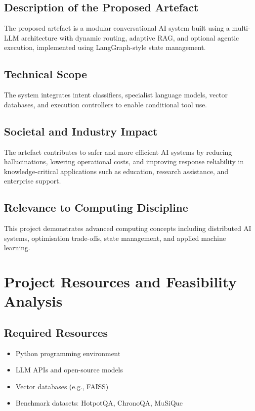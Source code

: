 \documentclass[12pt,a4paper]{article}
\begin{document}
\subsection{Description of the Proposed Artefact}

The proposed artefact is a modular conversational AI system built using a multi-LLM architecture with dynamic routing, adaptive RAG, and optional agentic execution, implemented using LangGraph-style state management.

\subsection{Technical Scope}

The system integrates intent classifiers, specialist language models, vector databases, and execution controllers to enable conditional tool use.

\subsection{Societal and Industry Impact}

The artefact contributes to safer and more efficient AI systems by reducing hallucinations, lowering operational costs, and improving response reliability in knowledge-critical applications such as education, research assistance, and enterprise support.

\subsection{Relevance to Computing Discipline}

This project demonstrates advanced computing concepts including distributed AI systems, optimisation trade-offs, state management, and applied machine learning.


\section{Project Resources and Feasibility Analysis}

\subsection{Required Resources}

\begin{itemize}
    \item Python programming environment
    \item LLM APIs and open-source models
    \item Vector databases (e.g., FAISS)
    \item Benchmark datasets: HotpotQA, ChronoQA, MuSiQue
\end{itemize}
\end{document}
